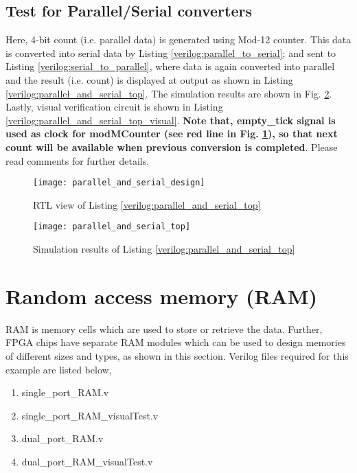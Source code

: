 

\subsection{Test for Parallel/Serial converters} \label{sec:testPS}
Here, 4-bit count (i.e. parallel data) is generated using Mod-12 counter. This data is converted into serial data by Listing \ref{verilog:parallel_to_serial}; and sent to Listing \ref{verilog:serial_to_parallel}, where data is again converted into parallel and the result (i.e. count) is displayed at output as shown in Listing \ref{verilog:parallel_and_serial_top}. The simulation results are shown in Fig. \ref{fig:parallel_and_serial_top}. Lastly, visual verification circuit is shown in Listing \ref{verilog:parallel_and_serial_top_visual}. \textbf{Note that, empty\_tick signal is used as clock for modMCounter (see red line in Fig. \ref{fig:parallel_and_serial_design}), so that next count will be available when previous conversion is completed}. Please read comments for further details.
\begin{figure}[!h]
	\centering
	\texttt{[image: parallel\_and\_serial\_design]}
	\caption{RTL view of Listing \ref{verilog:parallel_and_serial_top}}
	\label{fig:parallel_and_serial_design}
\end{figure}



\begin{figure}[!h]
	\centering
	\texttt{[image: parallel\_and\_serial\_top]}
	\caption{Simulation results of Listing \ref{verilog:parallel_and_serial_top}}
	\label{fig:parallel_and_serial_top}
\end{figure}



\section{Random access memory (RAM)}
RAM is memory cells which are used to store or retrieve the data. Further, FPGA chips have separate RAM modules which can be used to design memories of different sizes and types, as shown in this section. Verilog files required for this example are listed below, 
\begin{enumerate}
	\item single\_port\_RAM.v
	\item single\_port\_RAM\_visualTest.v
	\item dual\_port\_RAM.v
	\item dual\_port\_RAM\_visualTest.v
\end{enumerate}

